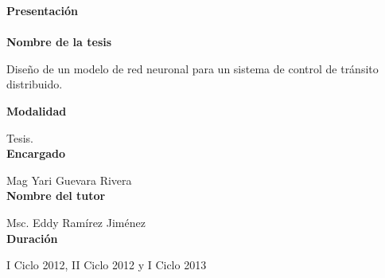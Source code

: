 \textbf{\LARGE{Presentaci\'{o}n}}\\\\

\textbf{Nombre de la tesis}


Dise\~{n}o de un modelo de red neuronal para un sistema de control de
tr\'{a}nsito distribuido.%

\textbf{Modalidad}

Tesis. \\
	
\textbf{Encargado}

Mag Yari Guevara Rivera \\
	
\textbf{Nombre del tutor}


 Msc. Eddy Ram\'{i}rez Jim\'{e}nez \\
	 
	
\textbf{Duraci\'{o}n}

 I Ciclo 2012, II Ciclo 2012 y I Ciclo 2013
